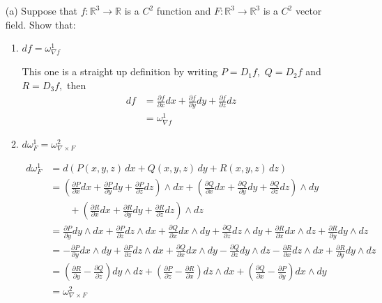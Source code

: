 \documentclass[11pt]{article}
\begin{document}
\begin{enumerate}
    \item[(a)] Suppose that \(f : \mathbb{R}^3 \to \mathbb{R}\) is a \(C^2\) function and \(F : \mathbb{R}^3 \to \mathbb{R}^3\) is a \(C^2\) vector field. Show that:
    \begin{enumerate}
        \item \(df = \omega^1_{\nabla f}\)
    \begin{solution}
        This one is a straight up definition by writing $P = D_1f,$ $Q = D_2f$ and $R = D_3f,$ then
        \begin{align*}
            df &= \frac{\partial f}{\partial x} dx + \frac{\partial f}{\partial y} dy + \frac{\partial f}{\partial z} dz \\
            &= \omega^1_{\nabla f}
        \end{align*}
    \end{solution}
        \item \(d\omega^1_F = \omega^2_{\nabla \times F}\)
        \begin{solution}
            
    \begin{align*}
        d\omega_F^1 &= d\left(P(x, y, z)\,dx + Q(x, y, z)\,dy + R(x, y, z)\,dz\right)\\
        &= \left(\frac{\partial P}{\partial x} dx + \frac{\partial P}{\partial y} dy + \frac{\partial P}{\partial z} dz\right)\wedge dx + \left(\frac{\partial Q}{\partial x} dx + \frac{\partial Q}{\partial y} dy + \frac{\partial Q}{\partial z} dz\right)\wedge dy\\
        &\qquad+ \left(\frac{\partial R}{\partial x} dx + \frac{\partial R}{\partial y} dy + \frac{\partial R}{\partial z} dz\right)\wedge dz\\
        &= \frac{\partial P}{\partial y} dy\wedge dx + \frac{\partial P}{\partial z} dz\wedge dx + \frac{\partial Q}{\partial x} dx \wedge dy+ \frac{\partial Q}{\partial z} dz\wedge dy + \frac{\partial R}{\partial x} dx\wedge dz + \frac{\partial R}{\partial y} dy \wedge dz\\
        &= -\frac{\partial P}{\partial y} dx\wedge dy + \frac{\partial P}{\partial z} dz\wedge dx + \frac{\partial Q}{\partial x} dx \wedge dy- \frac{\partial Q}{\partial z} dy\wedge dz - \frac{\partial R}{\partial x} dz\wedge dx + \frac{\partial R}{\partial y} dy \wedge dz\\\
        &= (\frac{\partial R}{\partial y} - \frac{\partial Q}{\partial z})dy \wedge dz + (\frac{\partial P}{\partial z} - \frac{\partial R}{\partial x})dz \wedge dx + (\frac{\partial Q}{\partial x} - \frac{\partial P}{\partial y})dx \wedge dy\\
        &= \omega_{\nabla \times F}^2
    \end{align*}
            \end{solution}


\end{enumerate}
\end{enumerate}
\end{document}
